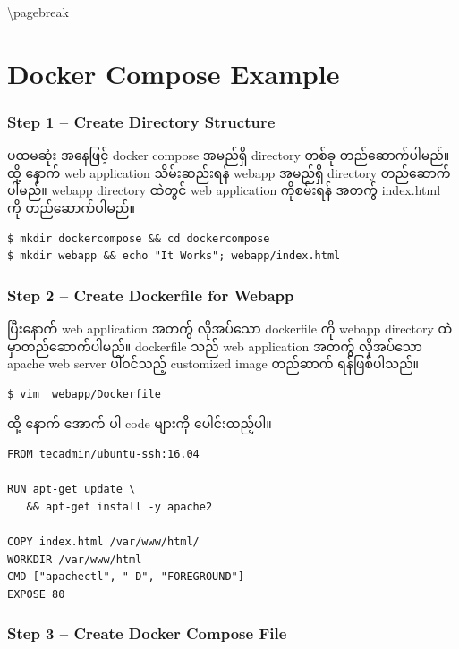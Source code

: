 \textbackslash{}pagebreak

\section{Docker Compose Example}\label{docker-compose-example}

\subsubsection{Step 1 -- Create Directory
Structure}\label{step-1-create-directory-structure}

ပထမဆုံး အနေဖြင့် docker compose အမည်ရှိ directory တစ်ခု တည်ဆောက်ပါမည်။
ထို့ နောက် web application သိမ်းဆည်းရန် webapp အမည်ရှိ directory
တည်ဆောက်ပါမည်။ webapp directory ထဲတွင် web application ကိုစမ်းရန် အတက်ွ
index.html ကို တည်ဆောက်ပါမည်။

\begin{verbatim}
$ mkdir dockercompose && cd dockercompose
$ mkdir webapp && echo "It Works"; webapp/index.html
\end{verbatim}

\subsubsection{Step 2 -- Create Dockerfile for
Webapp}\label{step-2-create-dockerfile-for-webapp}

ပြီးနောက် web application အတက်ွ လိုအပ်သော dockerfile ကို webapp
directory ထဲမှာတည်ဆောက်ပါမည်။ dockerfile သည် web application အတက်ွ
လိုအပ်သော apache web server ပါ၀င်သည့် customized image တည်ဆာက်
ရန်ဖြစ်ပါသည်။

\begin{verbatim}
$ vim  webapp/Dockerfile
\end{verbatim}

ထို့ နောက် အောက် ပါ code များကို ပေါင်းထည့်ပါ။

\begin{verbatim}
FROM tecadmin/ubuntu-ssh:16.04

RUN apt-get update \
   && apt-get install -y apache2

COPY index.html /var/www/html/
WORKDIR /var/www/html
CMD ["apachectl", "-D", "FOREGROUND"]
EXPOSE 80
\end{verbatim}

\subsubsection{Step 3 -- Create Docker Compose
File}\label{step-3-create-docker-compose-file}

